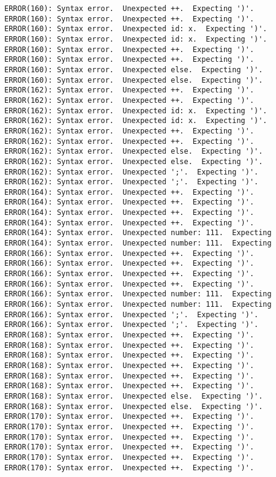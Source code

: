 \documentclass[12pt]{book}
\begin{document}
\begin{lstlisting}
ERROR(160): Syntax error.  Unexpected ++.  Expecting ')'.	ERROR(160): Syntax error.  Unexpected ++.  Expecting ')'.
ERROR(160): Syntax error.  Unexpected id: x.  Expecting ')'.	ERROR(160): Syntax error.  Unexpected id: x.  Expecting ')'.
ERROR(160): Syntax error.  Unexpected ++.  Expecting ')'.	ERROR(160): Syntax error.  Unexpected ++.  Expecting ')'.
ERROR(160): Syntax error.  Unexpected else.  Expecting ')'.	ERROR(160): Syntax error.  Unexpected else.  Expecting ')'.
ERROR(162): Syntax error.  Unexpected ++.  Expecting ')'.	ERROR(162): Syntax error.  Unexpected ++.  Expecting ')'.
ERROR(162): Syntax error.  Unexpected id: x.  Expecting ')'.	ERROR(162): Syntax error.  Unexpected id: x.  Expecting ')'.
ERROR(162): Syntax error.  Unexpected ++.  Expecting ')'.	ERROR(162): Syntax error.  Unexpected ++.  Expecting ')'.
ERROR(162): Syntax error.  Unexpected else.  Expecting ')'.	ERROR(162): Syntax error.  Unexpected else.  Expecting ')'.
ERROR(162): Syntax error.  Unexpected ';'.  Expecting ')'.	ERROR(162): Syntax error.  Unexpected ';'.  Expecting ')'.
ERROR(164): Syntax error.  Unexpected ++.  Expecting ')'.	ERROR(164): Syntax error.  Unexpected ++.  Expecting ')'.
ERROR(164): Syntax error.  Unexpected ++.  Expecting ')'.	ERROR(164): Syntax error.  Unexpected ++.  Expecting ')'.
ERROR(164): Syntax error.  Unexpected number: 111.  Expecting	ERROR(164): Syntax error.  Unexpected number: 111.  Expecting
ERROR(166): Syntax error.  Unexpected ++.  Expecting ')'.	ERROR(166): Syntax error.  Unexpected ++.  Expecting ')'.
ERROR(166): Syntax error.  Unexpected ++.  Expecting ')'.	ERROR(166): Syntax error.  Unexpected ++.  Expecting ')'.
ERROR(166): Syntax error.  Unexpected number: 111.  Expecting	ERROR(166): Syntax error.  Unexpected number: 111.  Expecting
ERROR(166): Syntax error.  Unexpected ';'.  Expecting ')'.	ERROR(166): Syntax error.  Unexpected ';'.  Expecting ')'.
ERROR(168): Syntax error.  Unexpected ++.  Expecting ')'.	ERROR(168): Syntax error.  Unexpected ++.  Expecting ')'.
ERROR(168): Syntax error.  Unexpected ++.  Expecting ')'.	ERROR(168): Syntax error.  Unexpected ++.  Expecting ')'.
ERROR(168): Syntax error.  Unexpected ++.  Expecting ')'.	ERROR(168): Syntax error.  Unexpected ++.  Expecting ')'.
ERROR(168): Syntax error.  Unexpected else.  Expecting ')'.	ERROR(168): Syntax error.  Unexpected else.  Expecting ')'.
ERROR(170): Syntax error.  Unexpected ++.  Expecting ')'.	ERROR(170): Syntax error.  Unexpected ++.  Expecting ')'.
ERROR(170): Syntax error.  Unexpected ++.  Expecting ')'.	ERROR(170): Syntax error.  Unexpected ++.  Expecting ')'.
ERROR(170): Syntax error.  Unexpected ++.  Expecting ')'.	ERROR(170): Syntax error.  Unexpected ++.  Expecting ')'.

\end{lstlisting}
\end{document}
